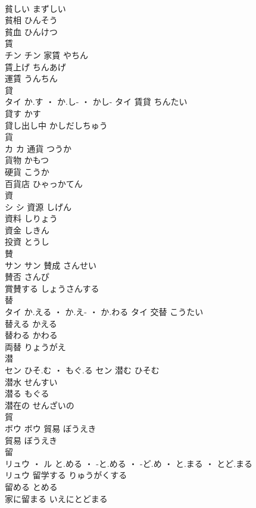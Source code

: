 \documentclass[8pt]{extreport}
\begin{document}
\begin{CJK}{UTF8}{min}
\\	貧しい	まずしい	
\\	貧相	ひんそう	
\\	貧血	ひんけつ	
\\	賃	
\\	チン		チン	家賃	やちん	
\\	賃上げ	ちんあげ	
\\	運賃	うんちん	
\\	貸	
\\	タイ	か.す ・ か.し- ・ かし-	タイ	賃貸	ちんたい	
\\	貸す	かす	
\\	貸し出し中	かしだしちゅう	
\\	貨	
\\	カ		カ	通貨	つうか	
\\	貨物	かもつ	
\\	硬貨	こうか	
\\	百貨店	ひゃっかてん	
\\	資	
\\	シ		シ	資源	しげん	
\\	資料	しりょう	
\\	資金	しきん	
\\	投資	とうし	
\\	賛	
\\	サン		サン	賛成	さんせい	
\\	賛否	さんぴ	
\\	賞賛する	しょうさんする	
\\	替	
\\	タイ	か.える ・ か.え- ・ か.わる	タイ	交替	こうたい	
\\	替える	かえる	
\\	替わる	かわる	
\\	両替	りょうがえ	
\\	潜	
\\	セン	ひそ.む ・ もぐ.る	セン	潜む	ひそむ	
\\	潜水	せんすい	
\\	潜る	もぐる	
\\	潜在の	せんざいの	
\\	貿	
\\	ボウ		ボウ	貿易	ぼうえき	
\\	貿易	ぼうえき	
\\	留	
\\	リュウ ・ ル	と.める ・ -と.める ・ -ど.め ・ と.まる ・ とど.まる
\\	リュウ	留学する	りゅうがくする	
\\	留める	とめる	
\\	家に留まる	いえにとどまる	

\end{CJK}
\end{document}
